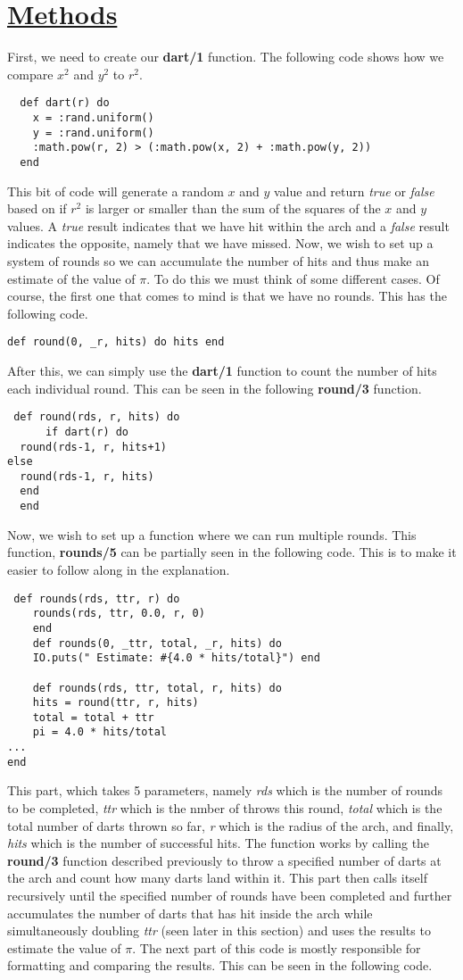\documentclass[a4paper,11pt]{article}
\begin{document}
\section*{
	\underline{Methods}
}
First, we need to create our \textbf{dart/1} function. The following code shows how we compare $x^2$ and $y^2$ to $r^2$.
\begin{verbatim}
  def dart(r) do
    x = :rand.uniform()
    y = :rand.uniform()
    :math.pow(r, 2) > (:math.pow(x, 2) + :math.pow(y, 2))
  end
\end{verbatim}
This bit of code will generate a random $x$ and $y$ value and return \textit{true} or \textit{false} based on if $r^2$ is larger or smaller than the sum of the squares of the $x$ and $y$ values. A \textit{true} result indicates that we have hit within the arch and a \textit{false} result indicates the opposite, namely that we have missed.
Now, we wish to set up a system of rounds so we can accumulate the number of hits and thus make an estimate of the value of $\pi$. To do this we must think of some different cases. Of course, the first one that comes to mind is that we have no rounds. This has the following code.
\begin{verbatim}
def round(0, _r, hits) do hits end
\end{verbatim}
After this, we can simply use the \textbf{dart/1} function to count the number of hits each individual round. This can be seen in the following \textbf{round/3} function.
\begin{verbatim}
 def round(rds, r, hits) do
      if dart(r) do
  round(rds-1, r, hits+1)
else
  round(rds-1, r, hits)
  end
  end
\end{verbatim}
Now, we wish to set up a function where we can run multiple rounds. This function, \textbf{rounds/5} can be partially seen in the following code. This is to make it easier to follow along in the explanation.
\begin{verbatim}
 def rounds(rds, ttr, r) do
    rounds(rds, ttr, 0.0, r, 0)
    end
    def rounds(0, _ttr, total, _r, hits) do 
    IO.puts(" Estimate: #{4.0 * hits/total}") end

    def rounds(rds, ttr, total, r, hits) do
    hits = round(ttr, r, hits)
    total = total + ttr
    pi = 4.0 * hits/total
...
end
\end{verbatim}
 This part, which takes 5 parameters, namely \textit{rds} which is the number of rounds to be completed, \textit{ttr} which is the nmber of throws this round, \textit{total} which is the total number of darts thrown so far, \textit{r} which is the radius of the arch, and finally, \textit{hits} which is the number of successful hits. The function works by calling the \textbf{round/3} function described previously to throw a specified number of darts at the arch and count how many darts land within it. This part then calls itself recursively until the specified number of rounds have been completed and further accumulates the number of darts that has hit inside the arch while simultaneously doubling \textit{ttr} (seen later in this section) and uses the results to estimate the value of $\pi$. The next part of this code is mostly responsible for formatting and comparing the results. This can be seen in the following code.
\end{document}

